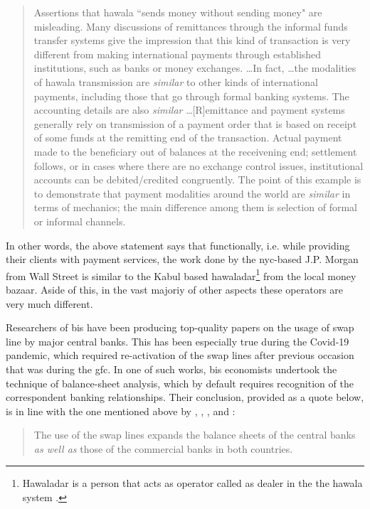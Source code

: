 \begin{quote}
Assertions that hawala ``sends money without sending money" are misleading. Many discussions of remittances through the informal funds transfer systems give the impression that this kind of transaction is very different from making international payments through established institutions, such as banks or money exchanges. \dots In fact, \dots the modalities of hawala transmission are \textit{similar} to other kinds of international payments, including those that go through formal banking systems. The accounting details are also \textit{similar} \dots [R]emittance and payment systems generally rely on transmission of a payment order that is based on receipt of some funds at the remitting end of the transaction. Actual payment made to the beneficiary out of balances at the receivening end; settlement follows, or in cases where there are no exchange control issues, institutional accounts can be debited/credited congruently. The point of this example is to demonstrate that payment modalities around the world are \textit{similar} in terms of mechanics; the main difference among them is selection of formal or informal channels. \citep[p.~14]{imf2003} 
\end{quote}

In other words, the above statement says that functionally, i.e. while providing their clients with payment services, the work done by the \ac{nyc}-based J.P. Morgan from Wall Street is similar to the Kabul based  hawaladar\footnote{Hawaladar is a person that acts as operator called as dealer in the the hawala system \citep[p.~328]{redin2014}.} from the local money bazaar. Aside of this, in the vast majoriy of other aspects these operators are very much different.

Researchers of \ac{bis} have been producing top-quality papers on the usage of swap line by major central banks. This has been especially true during the Covid-19 pandemic, which required re-activation of the swap lines after previous occasion that was during the \ac{gfc}. In one of such works, \ac{bis} economists undertook the technique of balance-sheet analysis, which by default requires recognition of the correspondent banking relationships.
Their conclusion, provided as a quote below, is in line with the one mentioned above by \citep{hewson1975}, \citep{earley1981}, \citep{stigum2007}, \citep{newman2013} and \citep{feygin2020}:

\begin{quote}
The use of the swap lines expands the balance sheets of the central banks \textit{as well as} those of the commercial banks in both countries. \citep[p.~6, emphasis original]{bis2020}
\end{quote}

